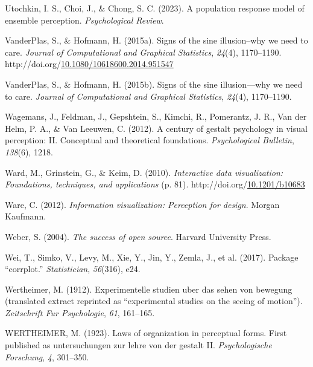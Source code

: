 \documentclass[print]{nuthesis}
\newlength{\cslhangindent}
\newenvironment{CSLReferences}[2]%
{\setlength{\parindent}{0pt}%
\everypar{\setlength{\hangindent}{\cslhangindent}}\ignorespaces}%
{\par}
\begin{document}
\begin{CSLReferences}{1}{0}
\leavevmode{}%
Utochkin, I. S., Choi, J., \& Chong, S. C. (2023). A population response model of ensemble perception. \emph{Psychological Review}.

\leavevmode{}%
VanderPlas, S., \& Hofmann, H. (2015a). Signs of the sine illusion--why we need to care. \emph{Journal of Computational and Graphical Statistics}, \emph{24}(4), 1170--1190. http://doi.org/\href{https://doi.org/10.1080/10618600.2014.951547}{10.1080/10618600.2014.951547}

\leavevmode{}%
VanderPlas, S., \& Hofmann, H. (2015b). Signs of the sine illusion---why we need to care. \emph{Journal of Computational and Graphical Statistics}, \emph{24}(4), 1170--1190.

\leavevmode{}%
Wagemans, J., Feldman, J., Gepshtein, S., Kimchi, R., Pomerantz, J. R., Van der Helm, P. A., \& Van Leeuwen, C. (2012). A century of gestalt psychology in visual perception: II. Conceptual and theoretical foundations. \emph{Psychological Bulletin}, \emph{138}(6), 1218.

\leavevmode{}%
Ward, M., Grinstein, G., \& Keim, D. (2010). \emph{Interactive data visualization: Foundations, techniques, and applications} (p. 81). http://doi.org/\href{https://doi.org/10.1201/b10683}{10.1201/b10683}

\leavevmode{}%
Ware, C. (2012). \emph{Information visualization: Perception for design}. Morgan Kaufmann.

\leavevmode{}%
Weber, S. (2004). \emph{The success of open source}. Harvard University Press.

\leavevmode{}%
Wei, T., Simko, V., Levy, M., Xie, Y., Jin, Y., Zemla, J., et al. (2017). Package {``corrplot.''} \emph{Statistician}, \emph{56}(316), e24.

\leavevmode{}%
Wertheimer, M. (1912). Experimentelle studien uber das sehen von bewegung (translated extract reprinted as {``experimental studies on the seeing of motion''}). \emph{Zeitschrift Fur Psychologie}, \emph{61}, 161--165.

\leavevmode{}%
WERTHEIMER, M. (1923). Laws of organization in perceptual forms. First published as untersuchungen zur lehre von der gestalt II. \emph{Psychologische Forschung}, \emph{4}, 301--350.


\end{CSLReferences}
\end{document}
